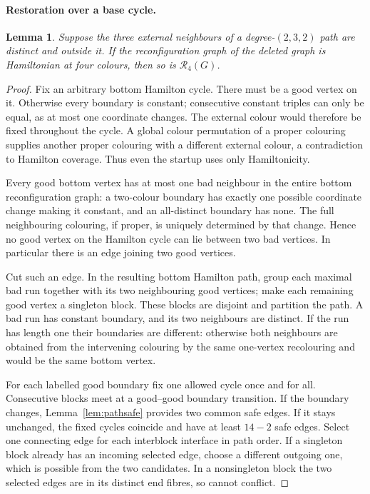\documentclass[11pt]{article}
\newtheorem{lemma}[theorem]{Lemma}
\theoremstyle{remark}
\newcommand{\R}{\mathcal R}
\numberwithin{equation}{section}
\numberwithin{table}{section}
\begin{document}
\paragraph{Restoration over a base cycle.}
\begin{lemma}\label{lem:path232}
Suppose the three external neighbours of a degree-$(2,3,2)$ path are
distinct and outside it. If the reconfiguration graph of the deleted
graph is Hamiltonian at four colours, then so is $\R_4(G)$.
\end{lemma}
\begin{proof}
Fix an arbitrary bottom Hamilton cycle. There must be a good vertex
on it. Otherwise every boundary is constant; consecutive constant
triples can only be equal, as at most one coordinate changes. The
external colour would therefore be fixed throughout the cycle. A
global colour permutation of a proper colouring supplies another
proper colouring with a different external colour, a contradiction
to Hamilton coverage. Thus even the startup uses only Hamiltonicity.

Every good bottom vertex has at most one bad neighbour in the entire
bottom reconfiguration graph: a two-colour boundary has exactly one
possible coordinate change making it constant, and an all-distinct
boundary has none. The full neighbouring colouring, if proper, is
uniquely determined by that change. Hence no good vertex on the
Hamilton cycle can lie between two bad vertices. In particular there
is an edge joining two good vertices.

Cut such an edge. In the resulting bottom Hamilton path, group each
maximal bad run together with its two neighbouring good vertices;
make each remaining good vertex a singleton block. These blocks are
disjoint and partition the path. A bad run has constant boundary,
and its two neighbours are distinct. If the run has length one their
boundaries are different: otherwise both neighbours are obtained from
the intervening colouring by the same one-vertex recolouring and
would be the same bottom vertex.

For each labelled good boundary fix one allowed cycle once and for
all. Consecutive blocks meet at a good--good boundary transition.
If the boundary changes, Lemma~\ref{lem:pathsafe} provides two common
safe edges. If it stays unchanged, the fixed cycles coincide and
have at least $14-2$ safe edges. Select one connecting edge for each
interblock interface in path order. If a singleton block already has
an incoming selected edge, choose a different outgoing one, which is
possible from the two candidates. In a nonsingleton block the two
selected edges are in its distinct end fibres, so cannot conflict.


\end{proof}
\end{document}
